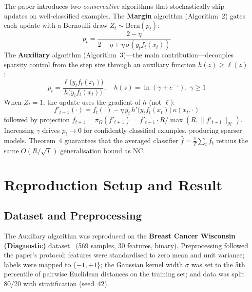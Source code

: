 \documentclass[conference,10pt]{IEEEtran}
\begin{document}
The paper introduces two \emph{conservative} algorithms that stochastically skip updates on well-classified examples. The \textbf{Margin} algorithm (Algorithm~2) gates each update with a Bernoulli draw $Z_t \sim \text{Bern}(p_t)$:
\begin{equation}
p_t = \frac{2 - \eta}{2 - \eta + \eta\, \sigma(y_t f_t(x_t))}
\label{eq:margin_prob}
\end{equation}
The \textbf{Auxiliary} algorithm (Algorithm~3)---the main contribution---decouples sparsity control from the step size through an auxiliary function $h(z) \ge \ell(z)$:
\begin{equation}
p_t = \frac{\ell\bigl(y_t f_t(x_t)\bigr)}{h\bigl(y_t f_t(x_t)\bigr)}, \quad h(z) = \ln(\gamma + e^{-z}),\; \gamma \ge 1
\label{eq:aux_prob}
\end{equation}
When $Z_t = 1$, the update uses the gradient of $h$ (not $\ell$):
\begin{equation}
f'_{t+1}(\cdot) = f_t(\cdot) - \eta\, y_t\, h'\bigl(y_t f_t(x_t)\bigr)\, \kappa(x_t, \cdot)
\label{eq:update}
\end{equation}
followed by projection $f_{t+1} = \pi_\Omega(f'_{t+1}) = f'_{t+1} \cdot R / \max(R, \|f'_{t+1}\|_{\mathcal{H}})$. Increasing $\gamma$ drives $p_t \to 0$ for confidently classified examples, producing sparser models. Theorem~4 guarantees that the averaged classifier $\hat{f} = \frac{1}{T}\sum_{t} f_t$ retains the same $O(R/\!\sqrt{T})$ generalisation bound as NC.

\section{Reproduction Setup and Result}

\subsection{Dataset and Preprocessing}

The Auxiliary algorithm was reproduced on the \textbf{Breast Cancer Wisconsin (Diagnostic)} dataset~\cite{uci_breast_cancer} (569 samples, 30 features, binary). Preprocessing followed the paper's protocol: features were standardised to zero mean and unit variance; labels were mapped to $\{-1,+1\}$; the Gaussian kernel width $\sigma$ was set to the 5th percentile of pairwise Euclidean distances on the training set; and data was split 80/20 with stratification (seed~42).
\end{document}
